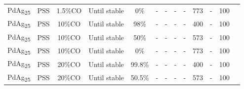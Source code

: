 \begin{longtable}{@{\extracolsep{\fill}}ccccccccccccc@{}}
    PdAg\textsubscript{25}                               & PSS               & 1.5\%CO & Until stable        & 0\%               & -  & -       & -                              & -           & 773                                    & -                   & 100                                                                                & \cite{Nguyen2009}                  \\

    PdAg\textsubscript{25}                               & PSS               & 10\%CO & Until stable        & 98\%               & -  & -       & -                              & -           & 400                                    & -                   & 100                                                                                & \cite{Nguyen2009}                  \\

    PdAg\textsubscript{25}                               & PSS               & 10\%CO & Until stable        & 50\%               & -  & -       & -                              & -           & 573                                    & -                   & 100                                                                                & \cite{Nguyen2009}                  \\

    PdAg\textsubscript{25}                               & PSS               & 10\%CO & Until stable        & 0\%               & -  & -       & -                              & -           & 773                                    & -                   & 100                                                                                & \cite{Nguyen2009}                  \\

    PdAg\textsubscript{25}                               & PSS               & 20\%CO & Until stable        & 99.8\%               & -  & -       & -                              & -           & 400                                    & -                   & 100                                                                                & \cite{Nguyen2009}                  \\

    PdAg\textsubscript{25}                               & PSS               & 20\%CO & Until stable        & 50.5\%               & -  & -       & -                              & -           & 573                                    & -                   & 100                                                                                & \cite{Nguyen2009}                  \\


\end{longtable}
